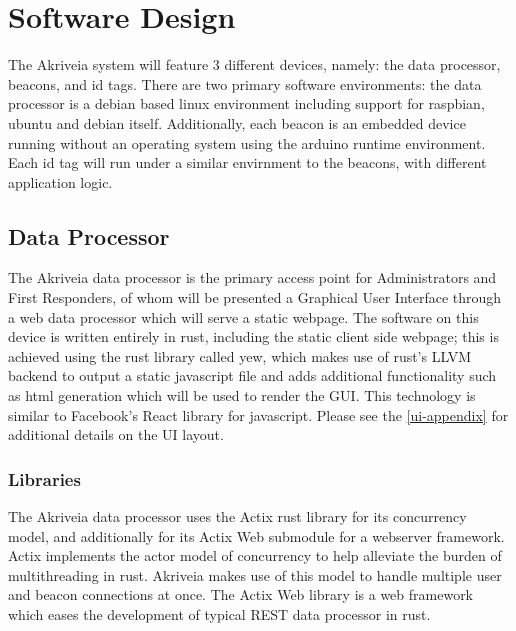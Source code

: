 

\setcounter{section}{5}
\section{Software Design}
\bigskip


The Akriveia system will feature 3 different devices, namely: the data processor, beacons, and id tags.
There are two primary software environments: the data processor is a debian based linux environment including support for raspbian, ubuntu and debian itself.
Additionally, each beacon is an embedded device running without an operating system using the arduino runtime environment.
Each id tag will run under a similar envirnment to the beacons, with different application logic.

\bigskip
\subsection{Data Processor}

The Akriveia data processor is the primary access point for Administrators and First Responders, of whom will be presented a Graphical User Interface through a web data processor which will serve a static webpage.
The software on this device is written entirely in rust, including the static client side webpage; this is achieved using the rust library called yew, which makes use of rust's LLVM backend to output a static javascript file and adds additional functionality such as html generation which will be used to render the GUI.
This technology is similar to Facebook's React library for javascript.
Please see the \ref{ui-appendix} for additional details on the UI layout.
\bigskip

\subsubsection{Libraries}
The Akriveia data processor uses the Actix rust library for its concurrency model, and additionally for its Actix Web submodule for a webserver framework.
Actix implements the actor model of concurrency to help alleviate the burden of multithreading in rust. Akriveia makes use of this model to handle multiple user and beacon connections at once.
The Actix Web library is a web framework which eases the development of typical REST data processor in rust.

